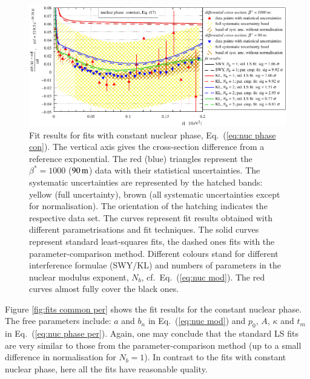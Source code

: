 \begin{figure}
\begin{center}
\includegraphics{fig/fits_common_con.pdf}
\caption{%
Fit results for fits with constant nuclear phase, Eq.~(\ref{eq:nuc phase con}). The vertical axis gives the cross-section difference from a reference exponential. The red (blue) triangles represent the $\beta^* = 1000$ ($90\,{\rm m}$) data with their statistical uncertainties. The systematic uncertainties are represented by the hatched bands: yellow (full uncertainty), brown (all systematic uncertainties except for normalisation). The orientation of the hatching indicates the respective data set.
The curves represent fit results obtained with different parametrisations and fit techniques. The solid curves represent standard least-squares fits, the dashed ones fits with the parameter-comparison method. Different colours stand for different interference formulae (SWY/KL) and numbers of parameters in the nuclear modulus exponent, $N_b$, cf.~Eq.~(\ref{eq:nuc mod}). The red curves almost fully cover the black ones.
}
\label{fig:fits common con}
\end{center}
\end{figure}

Figure \ref{fig:fits common per} shows the fit results for the constant nuclear phase. The free parameters include: $a$ and $b_n$ in Eq.~(\ref{eq:nuc mod}) and $p_0$, $A$, $\kappa$ and $t_m$ in Eq.~(\ref{eq:nuc phase per}). Again, one may conclude that the standard LS fits are very similar to those from the parameter-comparison method (up to a small difference in normalisation for $N_b = 1$). In contrast to the fits with constant nuclear phase, here all the fits have reasonable quality.

